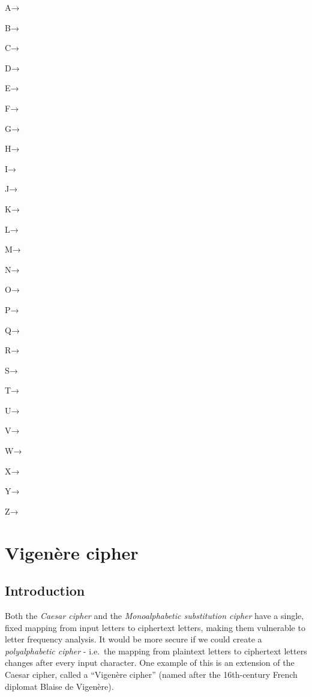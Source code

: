 \documentclass[
  letterpaper,
  DIV=11,
  numbers=noendperiod]{scrreprt}
\begin{document}
\leavevmode{}%

\hypertarget{decrypt_letters}{}
\hypertarget{da}{}
A→

\hypertarget{db}{}
B→

\hypertarget{dc}{}
C→

\hypertarget{dd}{}
D→

\hypertarget{de}{}
E→

\hypertarget{df}{}
F→

\hypertarget{dg}{}
G→

\hypertarget{dh}{}
H→

\hypertarget{di}{}
I→

\hypertarget{dj}{}
J→

\hypertarget{dk}{}
K→

\hypertarget{dl}{}
L→

\hypertarget{dm}{}
M→

\hypertarget{dn}{}
N→

\hypertarget{do}{}
O→

\hypertarget{dp}{}
P→

\hypertarget{dq}{}
Q→

\hypertarget{dr}{}
R→

\hypertarget{ds}{}
S→

\hypertarget{dt}{}
T→

\hypertarget{du}{}
U→

\hypertarget{dv}{}
V→

\hypertarget{dw}{}
W→

\hypertarget{dx}{}
X→

\hypertarget{dy}{}
Y→

\hypertarget{dz}{}
Z→

\hypertarget{decode-remaining}{}

\hypertarget{container}{}
\hypertarget{content}{}

\hypertarget{vigenuxe8re-cipher}{%
\chapter{Vigenère cipher}\label{vigenuxe8re-cipher}}

\hypertarget{introduction-2}{%
\section{Introduction}\label{introduction-2}}

Both the \emph{Caesar cipher} and the \emph{Monoalphabetic substitution
cipher} have a single, fixed mapping from input letters to ciphertext
letters, making them vulnerable to letter frequency analysis. It would
be more secure if we could create a \emph{polyalphabetic cipher} -
i.e.~the mapping from plaintext letters to ciphertext letters changes
after every input character. One example of this is an extension of the
Caesar cipher, called a ``Vigenère cipher'' (named after the
16th-century French diplomat Blaise de Vigenère).
\end{document}
